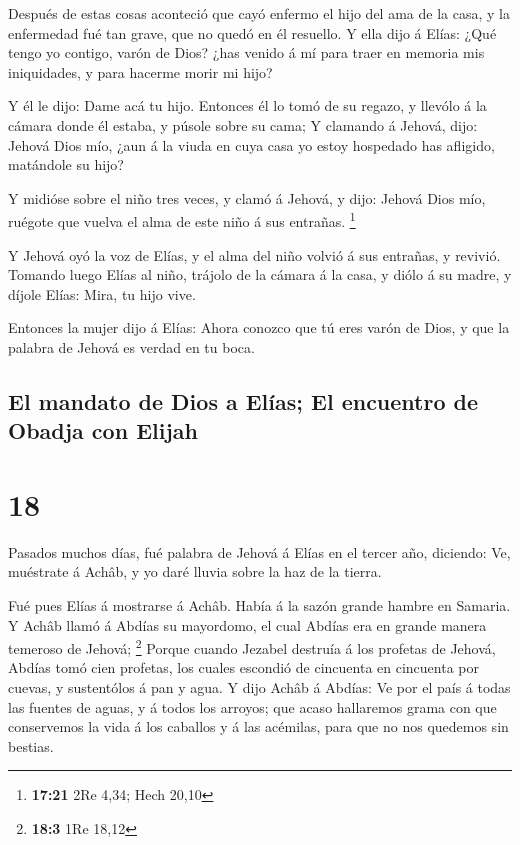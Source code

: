  Después de estas cosas aconteció que cayó enfermo el hijo
del ama de la casa, y la enfermedad fué tan grave, que no quedó en él
resuello.  Y ella dijo á Elías: ¿Qué tengo yo contigo,
varón de Dios? ¿has venido á mí para traer en memoria mis iniquidades, y
para hacerme morir mi hijo?

 Y él le dijo: Dame acá tu hijo. Entonces él lo tomó de su
regazo, y llevólo á la cámara donde él estaba, y púsole sobre su cama;
 Y clamando á Jehová, dijo: Jehová Dios mío, ¿aun á la
viuda en cuya casa yo estoy hospedado has afligido, matándole su hijo?

 Y midióse sobre el niño tres veces, y clamó á Jehová, y
dijo: Jehová Dios mío, ruégote que vuelva el alma de este niño á sus
entrañas. \footnote{\textbf{17:21} 2Re 4,34; Hech 20,10}

 Y Jehová oyó la voz de Elías, y el alma del niño volvió á
sus entrañas, y revivió.  Tomando luego Elías al niño,
trájolo de la cámara á la casa, y diólo á su madre, y díjole Elías:
Mira, tu hijo vive.

 Entonces la mujer dijo á Elías: Ahora conozco que tú eres
varón de Dios, y que la palabra de Jehová es verdad en tu boca.

\hypertarget{el-mandato-de-dios-a-eluxedas-el-encuentro-de-obadja-con-elijah}{%
\subsection{El mandato de Dios a Elías; El encuentro de Obadja con
Elijah}\label{el-mandato-de-dios-a-eluxedas-el-encuentro-de-obadja-con-elijah}}

\hypertarget{section-17}{%
\section{18}\label{section-17}}

 Pasados muchos días, fué palabra de Jehová á Elías en el
tercer año, diciendo: Ve, muéstrate á Achâb, y yo daré lluvia sobre la
haz de la tierra.

 Fué pues Elías á mostrarse á Achâb. Había á la sazón grande
hambre en Samaria.  Y Achâb llamó á Abdías su mayordomo, el
cual Abdías era en grande manera temeroso de Jehová; \footnote{\textbf{18:3}
  1Re 18,12}  Porque cuando Jezabel destruía á los profetas
de Jehová, Abdías tomó cien profetas, los cuales escondió de cincuenta
en cincuenta por cuevas, y sustentólos á pan y agua.  Y dijo
Achâb á Abdías: Ve por el país á todas las fuentes de aguas, y á todos
los arroyos; que acaso hallaremos grama con que conservemos la vida á
los caballos y á las acémilas, para que no nos quedemos sin bestias.

